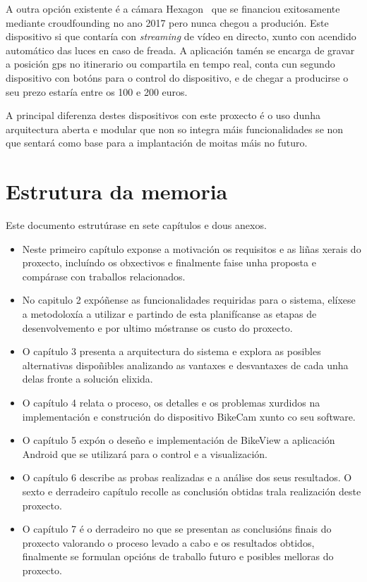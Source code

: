  A outra opción existente é a cámara Hexagon~\cite{HEXAGONCameraSignals} que se financiou exitosamente mediante croudfounding no ano 2017 pero nunca chegou a produción. Este dispositivo si que contaría con \emph{streaming} de vídeo en directo, xunto con acendido automático das luces en caso de freada. A aplicación tamén se encarga de gravar a posición gps no itinerario ou compartila en tempo real, conta cun segundo dispositivo con botóns para o control do dispositivo, e de chegar a producirse o seu prezo estaría entre os 100 e 200 euros.

 A principal diferenza destes dispositivos con este proxecto é o uso dunha arquitectura aberta e modular que non so integra máis funcionalidades se non que sentará como base para a implantación de moitas máis no futuro.


\section{Estrutura da memoria}
Este documento estrutúrase en sete capítulos e dous anexos.
\begin{itemize}
  \item Neste primeiro capítulo exponse a motivación os requisitos e as liñas xerais do proxecto, incluíndo os obxectivos e finalmente faise unha proposta e compárase con traballos relacionados.
  \item No capitulo 2 expóñense as funcionalidades requiridas para o sistema, elíxese a metodoloxía a utilizar e partindo de esta planifícanse as etapas de desenvolvemento e por ultimo móstranse os custo do proxecto.
  \item O capítulo 3 presenta a arquitectura do sistema e explora as posibles alternativas dispoñibles analizando as vantaxes e desvantaxes de cada unha delas fronte a solución elixida.
  \item O capítulo 4 relata o proceso, os detalles e os problemas xurdidos na implementación e construción do dispositivo BikeCam xunto co seu software.
  \item O capítulo 5 expón o deseño e implementación de BikeView a aplicación Android que se utilizará para o control e a visualización.
  \item O capítulo 6 describe as probas realizadas e a análise dos seus resultados. O sexto e derradeiro capítulo recolle as conclusión obtidas trala realización deste proxecto.
  \item O capítulo 7 é o derradeiro no que se presentan as conclusións finais do proxecto valorando o proceso levado a cabo e os resultados obtidos, finalmente se formulan opcións de traballo futuro e posibles melloras do proxecto.
\end{itemize}
